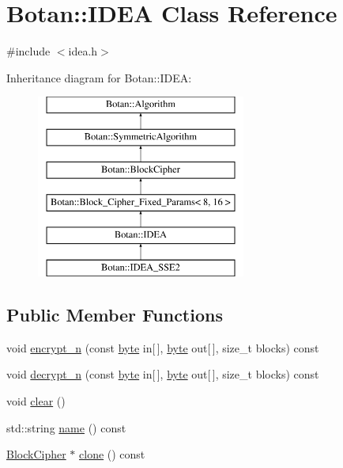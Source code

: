 \hypertarget{classBotan_1_1IDEA}{\section{Botan\-:\-:I\-D\-E\-A Class Reference}
\label{classBotan_1_1IDEA}
}


{\ttfamily \#include $<$idea.\-h$>$}

Inheritance diagram for Botan\-:\-:I\-D\-E\-A\-:\begin{figure}[H]
\begin{center}
\leavevmode
\includegraphics[height=6.000000cm]{classBotan_1_1IDEA}
\end{center}
\end{figure}
\subsection*{Public Member Functions}
\begin{DoxyCompactItemize}
\item 
void \hyperlink{classBotan_1_1IDEA_afafb299de70de2d1421124320f60786d}{encrypt\-\_\-n} (const \hyperlink{namespaceBotan_a7d793989d801281df48c6b19616b8b84}{byte} in\mbox{[}$\,$\mbox{]}, \hyperlink{namespaceBotan_a7d793989d801281df48c6b19616b8b84}{byte} out\mbox{[}$\,$\mbox{]}, size\-\_\-t blocks) const 
\item 
void \hyperlink{classBotan_1_1IDEA_aaf4f7808abd1e7f2072b32a0bcfa58c2}{decrypt\-\_\-n} (const \hyperlink{namespaceBotan_a7d793989d801281df48c6b19616b8b84}{byte} in\mbox{[}$\,$\mbox{]}, \hyperlink{namespaceBotan_a7d793989d801281df48c6b19616b8b84}{byte} out\mbox{[}$\,$\mbox{]}, size\-\_\-t blocks) const 
\item 
void \hyperlink{classBotan_1_1IDEA_a9a22acfa0f2a82d31178818dcfdb5e9f}{clear} ()
\item 
std\-::string \hyperlink{classBotan_1_1IDEA_a14e5f3b075880f42a42ebad181a48589}{name} () const 
\item 
\hyperlink{classBotan_1_1BlockCipher}{Block\-Cipher} $\ast$ \hyperlink{classBotan_1_1IDEA_a2404d5630f341640aa8b18d044e53603}{clone} () const 
\end{DoxyCompactItemize}
